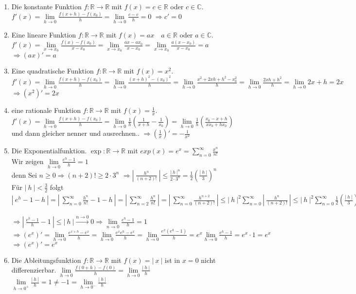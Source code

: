 \documentclass[a4paper,titlepage,oneside]{article}
\def\C{\ensuremath{\mathbb{C}} }
\def\R{\ensuremath{\mathbb{R}} }
\def\e{\ensuremath{\mathit{e}} }
\newcommand{\suminf}[2][n]{\ensuremath{\sum_{#1= 0}^{\infty}{#2}}}
\newcommand{\limnull}[2][n]{\ensuremath{\lim\limits_{#1 \rightarrow 0}{#2}}}
\newcommand{\limAB}[3][x]{\ensuremath{\lim\limits_{#1 \rightarrow #2}{#3}}}
\newcommand{\limA}[2][x_0]{\limAB{#1}{#2}}
\newcommand{\limpos}[3][n]{\ensuremath{\lim\limits_{#1 \rightarrow #2^+}{#3}}}
\newcommand{\limneg}[3][n]{\ensuremath{\lim\limits_{#1 \rightarrow #2^-}{#3}}}
\newcommand{\abs}[1]{\ensuremath{\left|\:#1\:\right|}}
\newcommand{\longtonull}[1][n]{\ensuremath{\overset{\scriptscriptstyle{#1 \to 0}}{\longrightarrow}}}
\theoremstyle{thmstyle}
\begin{document}
\begin{bsp}
\begin{enumerate}
\item Die konstante Funktion
$f: \R \to \R$ mit $ f(x) = c \in \R $ oder $ c \in \C $. $f'(x) = \limnull[h]{\frac{f(x + h) - f(x_0)}{h}} = \limnull[h]{\frac{c-c}{h}} = 0$
$\Rightarrow c' = 0$
\item Eine lineare Funktion
$f: \R \to \R$ mit $ f(x) = ax \quad a \in \R $ oder $ a \in \C $. $f'(x) = \limA{\frac{f(x) - f(x_0)}{x-x_0}} = \limA{\frac{ax - ax_0}{x-x_0}} = \limA{\frac{a(x-x_0)}{x-x_0}} = a$
$\Rightarrow (ax)' = a$
\item Eine quadratische Funktion
$f: \R \to \R$ mit $ f(x) = x^2 $. $f'(x) = \limnull[h]{\frac{f(x + h) - f(x_0)}{h}} = \limnull[h]{\frac{(x + h)^2 - (x_0)^2}{h}} = \limnull[h]{\frac{x^2 + 2xh + h^2 - x_0^2}{h}} =  \limnull[h]{\frac{2xh + h^2}{h}} = \limnull[h]{2x + h}  = 2x$
$\Rightarrow (x^2)' = 2x$
\item eine rationale Funktion
$f: \R \to \R$ mit $ f(x) = \frac{1}{x} $. $f'(x) = \limnull[h]{\frac{f(x + h) - f(x_0)}{h}} = \limnull[h]{\frac{1}{h}\left(\frac{1}{x + h} - \frac{1}{x_0}\right)} = \limnull[h]{\frac{1}{h}\left(\frac{x_0- x +h}{xx_0 + hx_0}\right)} $ und dann gleicher nenner und ausrechnen..
$\Rightarrow \left(\frac{1}{x}\right)' = -\frac{1}{x^2}$
\item Die Exponentialfunktion.
$\exp: \R \to \R$ mit $exp(x) = \e^x = \suminf{\frac{x^n}{n!}}$ \\
Wir zeigen $\limnull[h]{\frac{e^h - 1}{h}} = 1$\\
denn Sei $n \ge 0 \Rightarrow (n+2)! \ge 2 \cdot 3^n$
$\Rightarrow \abs{\frac{h^n}{(n+2)!}} \le \frac{\abs{h}^n}{2\cdot 3^n} = \frac{1}{2}\left(\frac{\abs{h}}{3}\right)^n$\\
Für $\displaystyle \abs{h} < \frac{3}{2}$ folgt $ \abs{\e^h - 1 - h} = \abs{\suminf{\frac{h^n}{n!}} - 1- h} = \abs{\sum_{n=2}^{\infty}{\frac{h^n}{n!}}} = \abs{\suminf{\frac{h^{n+2}}{(n+2)!}}} \le \abs{h}^2 \suminf{\abs{\frac{h^n}{(n+2)!}}} \le \abs{h}^2\suminf{\frac{1}{2}\left(\frac{\abs{h}}{3}\right)^h} = \frac{\abs{h}^2}{2}\suminf{\underbrace{\left(\frac{\abs{h}}{3}\right)^h}_{<1}} \overset{\text{geometrische Reihe}}{=} = \frac{\abs{h}^2}{2} \frac{1}{1-\underbrace{\frac{\abs{h}}{3}}_{< \frac{1}{2}}} \le \abs{h^2}$\\
$\Rightarrow \abs{\frac{e^h - 1}{h} - 1} \le \abs{h} \longtonull 0 \Rightarrow \limnull{\frac{e^h - 1}{h}} = 1$ \\
$\Rightarrow (\e^x)' = \limnull[h]{\frac{\e^{x+h} - \e^x}{h}} = \limnull[h]{\frac{\e^x\e^h-\e^x}{h}} = \limnull[h]{\frac{\e^x(\e^h-1)}{h}} = \e^x\limnull[h]{\frac{\e^h-1}{h}} = \e^x \cdot 1 = \e^x$\\
$\Rightarrow (\e^x)' = \e^x $
\item Die Ableitungsfunktion
$f: \R \to \R$ mit $ f(x) = \abs{x} $ ist in $ x = 0$ nicht differenzierbar. $\limnull[h]{\frac{f(0 + h) - f(0)}{h}} = \limnull[h]{\frac{\abs{h}}{h}}$\\
$\limpos[h]{0}{\frac{\abs{h}}{h}} = 1 \ne -1 = \limneg[h]{0}{\frac{\abs{h}}{h}}$
\end{enumerate}
\end{bsp}
\end{document}
